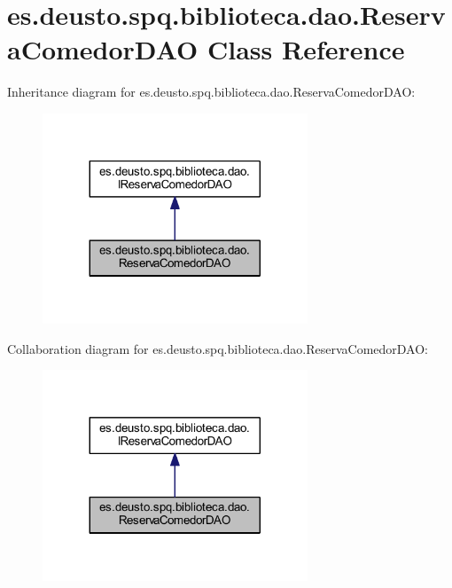 \hypertarget{classes_1_1deusto_1_1spq_1_1biblioteca_1_1dao_1_1_reserva_comedor_d_a_o}{}\section{es.\+deusto.\+spq.\+biblioteca.\+dao.\+Reserva\+Comedor\+D\+AO Class Reference}
\label{classes_1_1deusto_1_1spq_1_1biblioteca_1_1dao_1_1_reserva_comedor_d_a_o}


Inheritance diagram for es.\+deusto.\+spq.\+biblioteca.\+dao.\+Reserva\+Comedor\+D\+AO\+:
\nopagebreak
\begin{figure}[H]
\begin{center}
\leavevmode
\includegraphics[width=224pt]{classes_1_1deusto_1_1spq_1_1biblioteca_1_1dao_1_1_reserva_comedor_d_a_o__inherit__graph}
\end{center}
\end{figure}


Collaboration diagram for es.\+deusto.\+spq.\+biblioteca.\+dao.\+Reserva\+Comedor\+D\+AO\+:
\nopagebreak
\begin{figure}[H]
\begin{center}
\leavevmode
\includegraphics[width=224pt]{classes_1_1deusto_1_1spq_1_1biblioteca_1_1dao_1_1_reserva_comedor_d_a_o__coll__graph}
\end{center}
\end{figure}
